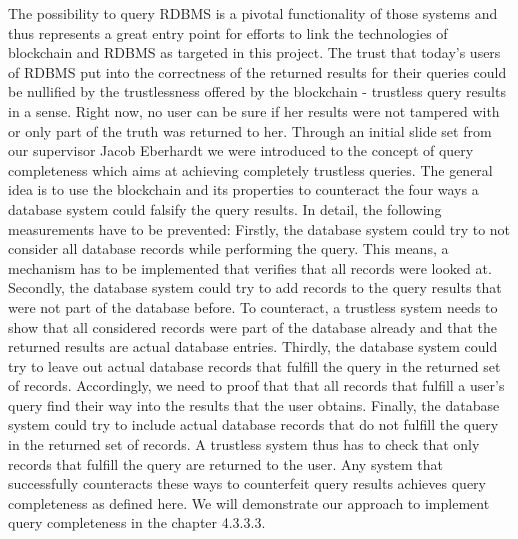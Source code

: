 The possibility to query RDBMS is a pivotal functionality of those systems and thus represents a great entry point for efforts to link the technologies of blockchain and RDBMS as targeted in this project. The trust that today’s users of RDBMS put into the correctness of the returned results for their queries could be nullified by the trustlessness offered by the blockchain - trustless query results in a sense. Right now, no user can be sure if her results were not tampered with or only part of the truth was returned to her.
Through an initial slide set from our supervisor Jacob Eberhardt we were introduced to the concept of query completeness which aims at achieving completely trustless queries. The general idea is to use the blockchain and its properties to counteract the four ways a database system could falsify the query results. In detail, the following measurements have to be prevented:
Firstly, the database system could try to not consider all database records while performing the query. This means, a mechanism has to be implemented that verifies that all records were looked at.
Secondly, the database system could try to add records to the query results that were not part of the database before. To counteract, a trustless system needs to show that all considered records were part of the database already and that the returned results are actual database entries.
Thirdly, the database system could try to leave out actual database records that fulfill the query in the returned set of records. Accordingly, we need to proof that that all records that fulfill a user’s query find their way into the results that the user obtains.
Finally, the database system could try to include actual database records that do not fulfill the query in the returned set of records. A trustless system thus has to check that only records that fulfill the query are returned to the user.
Any system that successfully counteracts these ways to counterfeit query results achieves query completeness as defined here. We will demonstrate our approach to implement query completeness in the chapter 4.3.3.3.
